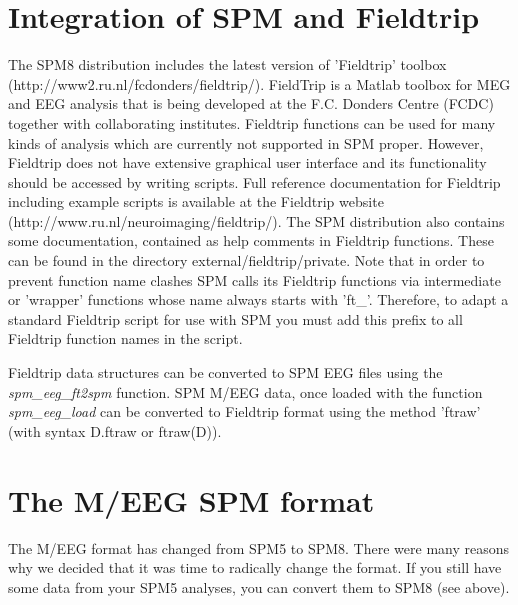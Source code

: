 \section{Integration of SPM and Fieldtrip}
The SPM8 distribution includes the latest version of 'Fieldtrip' toolbox
(http://www2.ru.nl/fcdonders/fieldtrip/). FieldTrip is a Matlab
toolbox for MEG and EEG analysis that is being developed at the
F.C. Donders Centre (FCDC) together with collaborating
institutes. Fieldtrip functions can be used for many kinds of analysis
which are currently not supported in SPM proper. However, Fieldtrip
does not have extensive graphical user interface and its functionality
should be accessed by writing scripts. Full reference documentation
for Fieldtrip including example scripts is available at the Fieldtrip
website (http://www.ru.nl/neuroimaging/fieldtrip/). The SPM
distribution also contains some documentation, contained as help
comments in Fieldtrip functions. These can be found in the directory 
external/fieldtrip/private. Note that in order to prevent function
name clashes SPM calls its Fieldtrip functions via 
intermediate or 'wrapper' functions whose name always starts with
'ft\_'. Therefore, to adapt a standard Fieldtrip script for use with SPM
you must add this prefix to all Fieldtrip function names in the
script.

Fieldtrip data structures can be converted to SPM EEG files using
the \textit{spm\_eeg\_ft2spm} function.  SPM M/EEG data, once loaded
with 
the function \textit{spm\_eeg\_load} can be converted to Fieldtrip
format using the method 'ftraw' (with syntax D.ftraw or ftraw(D)).


\section{The M/EEG SPM format}
The M/EEG format has changed from SPM5 to SPM8. There were many
reasons why we decided that it was time to radically change the
format. If you still have some data from your SPM5 analyses, you can
convert them to SPM8 (see above). 

